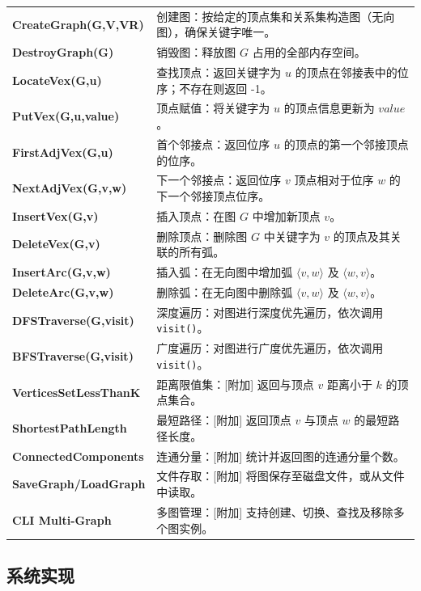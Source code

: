 \documentclass[supercite]{Experimental_Report}
\theoremstyle{definition}
\begin{document}
\noindent
\begin{tabularx}{\textwidth}{p{4.5cm} X} %
	\textbf{CreateGraph(G,V,VR)} & 创建图：按给定的顶点集和关系集构造图（无向图），确保关键字唯一。 \\
	\textbf{DestroyGraph(G)} & 销毁图：释放图 $G$ 占用的全部内存空间。 \\
	\textbf{LocateVex(G,u)} & 查找顶点：返回关键字为 $u$ 的顶点在邻接表中的位序；不存在则返回 -1。 \\
	\textbf{PutVex(G,u,value)} & 顶点赋值：将关键字为 $u$ 的顶点信息更新为 $value$。 \\
	\textbf{FirstAdjVex(G,u)} & 首个邻接点：返回位序 $u$ 的顶点的第一个邻接顶点的位序。 \\
	\textbf{NextAdjVex(G,v,w)} & 下一个邻接点：返回位序 $v$ 顶点相对于位序 $w$ 的下一个邻接顶点位序。 \\
	\textbf{InsertVex(G,v)} & 插入顶点：在图 $G$ 中增加新顶点 $v$。 \\
	\textbf{DeleteVex(G,v)} & 删除顶点：删除图 $G$ 中关键字为 $v$ 的顶点及其关联的所有弧。 \\
	\textbf{InsertArc(G,v,w)} & 插入弧：在无向图中增加弧 $\langle v,w \rangle$ 及 $\langle w,v \rangle$。 \\
	\textbf{DeleteArc(G,v,w)} & 删除弧：在无向图中删除弧 $\langle v,w \rangle$ 及 $\langle w,v \rangle$。 \\
	\textbf{DFSTraverse(G,visit)} & 深度遍历：对图进行深度优先遍历，依次调用 \texttt{visit()}。 \\
	\textbf{BFSTraverse(G,visit)} & 广度遍历：对图进行广度优先遍历，依次调用 \texttt{visit()}。 \\
	\textbf{VerticesSetLessThanK} & 距离限值集：[附加] 返回与顶点 $v$ 距离小于 $k$ 的顶点集合。 \\
	\textbf{ShortestPathLength} & 最短路径：[附加] 返回顶点 $v$ 与顶点 $w$ 的最短路径长度。 \\
	\textbf{ConnectedComponents} & 连通分量：[附加] 统计并返回图的连通分量个数。 \\
	\textbf{SaveGraph/LoadGraph} & 文件存取：[附加] 将图保存至磁盘文件，或从文件中读取。 \\
	\textbf{CLI Multi-Graph} & 多图管理：[附加] 支持创建、切换、查找及移除多个图实例。 \\
\end{tabularx}

\subsection{系统实现}
\end{document}

